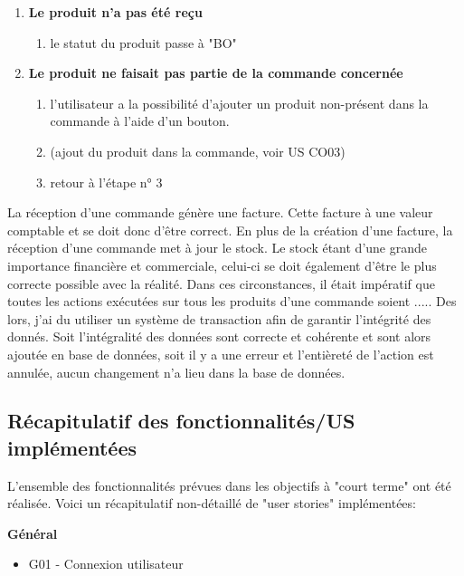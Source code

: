 \begin{enumerate}
  \newpara
  \item \textbf{Le produit n'a pas été reçu}
  \begin{enumerate}
    \item le statut du produit passe à "BO"
  \end{enumerate}

  \newpara
  \item \textbf{Le produit ne faisait pas partie de la commande concernée}
  \begin{enumerate}
    \item l'utilisateur a la possibilité d'ajouter un produit non-présent dans la commande à l'aide d'un bouton.
    \item (ajout du produit dans la commande, voir US CO03)
    \item retour à l'étape n° 3
  \end{enumerate}

\end{enumerate}

\newpara

La réception d'une commande génère une facture. Cette facture à une valeur comptable et se doit donc d'être correct. En plus de la création d'une facture, la réception d'une commande met à jour le stock. Le stock étant d'une grande importance financière et commerciale, celui-ci se doit également d'être le plus correcte possible avec la réalité. Dans ces circonstances, il était impératif que toutes les actions exécutées sur tous les produits d'une commande soient ..... Des lors, j'ai du utiliser un système de transaction afin de garantir l'intégrité des donnés. Soit l'intégralité des données sont correcte et cohérente et sont alors ajoutée en base de données, soit il y a une erreur et l'entièreté de l'action est annulée, aucun changement n'a lieu dans la base de données. 

\newpage

\subsection{Récapitulatif des fonctionnalités/US implémentées}
L'ensemble des fonctionnalités prévues dans les objectifs à "court terme" ont été réalisée. Voici un récapitulatif non-détaillé de "user stories" implémentées:  

\newpara
\textbf{Général}
\begin{itemize}
  \item \checkmark G01 - Connexion utilisateur
\end{itemize}

